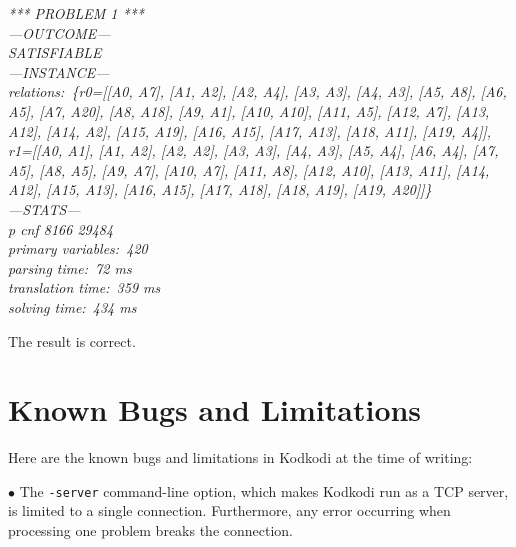 \documentclass[a4paper,12pt]{article}
\begin{document}
\begin{enum}
\pre
\ttfamily\small\slshape
*** PROBLEM 1 *** \\[2\smallskipamount]
---OUTCOME--- \\
SATISFIABLE \\[2\smallskipamount]
---INSTANCE--- \\
relations:~\{r0=[[A0, A7], [A1, A2], [A2, A4], [A3, A3], [A4, A3], [A5, A8],
[A6, A5], [A7, A20], [A8, A18], [A9, A1], [A10, A10], [A11, A5], [A12, A7],
[A13, A12], [A14, A2], [A15, A19], [A16, A15], [A17, A13], [A18, A11], [A19,
A4]], r1=[[A0, A1], [A1, A2], [A2, A2], [A3, A3], [A4, A3], [A5, A4], [A6, A4],
[A7, A5], [A8, A5], [A9, A7], [A10, A7], [A11, A8], [A12, A10], [A13, A11],
[A14, A12], [A15, A13], [A16, A15], [A17, A18], [A18, A19], [A19, A20]]\}
\\[2\smallskipamount]
---STATS--- \\
p cnf 8166 29484 \\
primary variables:~420 \\
parsing time:~72 ms \\
translation time:~359 ms \\
solving time:~434 ms
\post

The result is correct.
\end{enum}

\section{Known Bugs and Limitations}
\label{known-bugs-and-limitations}

Here are the known bugs and limitations in Kodkodi at the time of writing:

\begin{enum}
\item[$\bullet$] The \texttt{-server} command-line option, which makes Kodkodi
run as a TCP server, is limited to a single connection. Furthermore, any error
occurring when processing one problem breaks the connection.
\end{enum}

\let\em=\sl
{}

\end{document}
